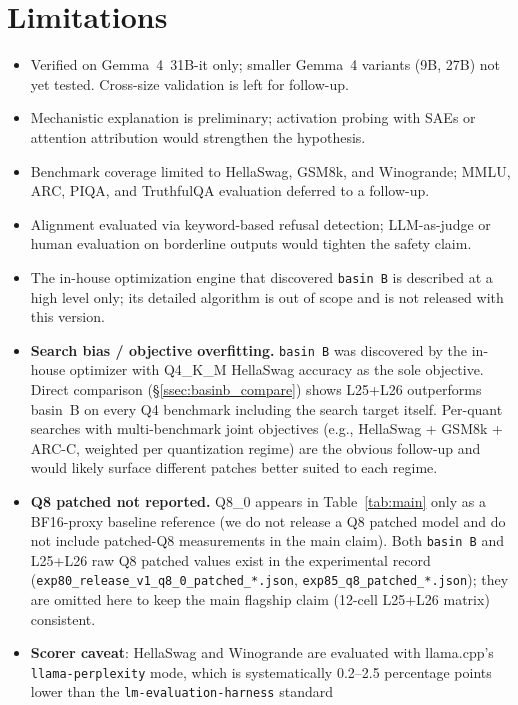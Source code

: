 \documentclass[11pt]{article}
\begin{document}
\section{Limitations}
\label{sec:limitations}
\begin{itemize}[leftmargin=*,itemsep=0pt]
  \item Verified on Gemma~4~31B-it only; smaller Gemma~4 variants (9B, 27B)
  not yet tested. Cross-size validation is left for follow-up.
  \item Mechanistic explanation is preliminary; activation probing with SAEs
  or attention attribution would strengthen the hypothesis.
  \item Benchmark coverage limited to HellaSwag, GSM8k, and Winogrande;
  MMLU, ARC, PIQA, and TruthfulQA evaluation deferred to a follow-up.
  \item Alignment evaluated via keyword-based refusal detection; LLM-as-judge
  or human evaluation on borderline outputs would tighten the safety claim.
  \item The in-house optimization engine that discovered
  \texttt{basin~B} is described at a high level only; its detailed algorithm
  is out of scope and is not released with this version.
  \item \textbf{Search bias / objective overfitting.} \texttt{basin~B} was
  discovered by the in-house optimizer with Q4\_K\_M HellaSwag accuracy as the sole objective.
  Direct comparison (\S\ref{ssec:basinb_compare}) shows L25+L26
  outperforms basin~B on every Q4 benchmark including the search target
  itself. Per-quant searches with multi-benchmark joint objectives
  (e.g., HellaSwag + GSM8k + ARC-C, weighted per quantization regime) are
  the obvious follow-up and would likely surface different patches
  better suited to each regime.
  \item \textbf{Q8 patched not reported.} Q8\_0 appears in
  Table~\ref{tab:main} only as a BF16-proxy baseline reference
  (we do not release a Q8 patched model and do not include patched-Q8
  measurements in the main claim). Both \texttt{basin~B} and L25+L26
  raw Q8 patched values exist in the experimental record
  (\texttt{exp80\_release\_v1\_q8\_0\_patched\_*.json},
  \texttt{exp85\_q8\_patched\_*.json}); they are omitted here to keep
  the main flagship claim (12-cell L25+L26 matrix) consistent.
  \item \textbf{Scorer caveat}: HellaSwag and Winogrande are evaluated with
  llama.cpp's \texttt{llama-perplexity} mode, which is systematically 0.2--2.5
  percentage points lower than the \texttt{lm-evaluation-harness} standard

\end{itemize}
\end{document}
